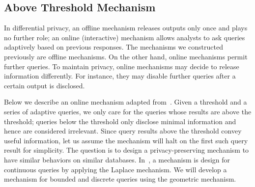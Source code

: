 \subsection{Above Threshold Mechanism}
\label{subsec:threshold}

In differential privacy, an offline mechanism releases outputs only
once and plays no further role; an online (interactive) mechanism
allows analysts to ask queries adaptively based on previous
responses. The mechanisms we constructed previously are offline
mechanisms. On the other hand, online mechanisms permit further queries. 
To maintain
privacy, online mechanisms may decide to release
information differently. For instance, they may disable further
queries after a certain output is disclosed.

Below we describe an online mechanism adapted from~\cite{DR:14:AFDP}.
Given a threshold and a series of adaptive queries, we only care for
the queries whose results are above the threshold; queries below the
threshold only disclose minimal information and hence are considered
irrelevant. Since query results above the threshold convey useful
information, let us assume the mechanism will halt on the first such
query result for simplicity. The question is to design a
privacy-preserving mechanism to have similar behaviors on similar
databases. In~\cite{DR:14:AFDP}, a mechanism is design for continuous
queries by applying the Laplace mechanism. We will develop a mechanism
for bounded and discrete queries using the geometric mechanism.


